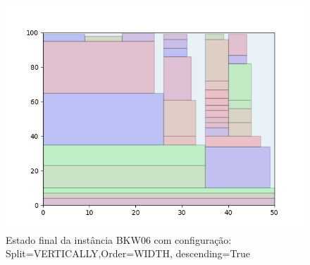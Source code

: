 \begin{figure}[H]
    \centering
    \caption[]{Estado final da instância BKW06 com configuração: Split=VERTICALLY,Order=WIDTH, descending=True}
    \label{fig:bkw06-vertically-width-true}
    \includegraphics[scale=0.5]{output/figures/bkw/bkw06/vertically/width/true/00}
\end{figure}